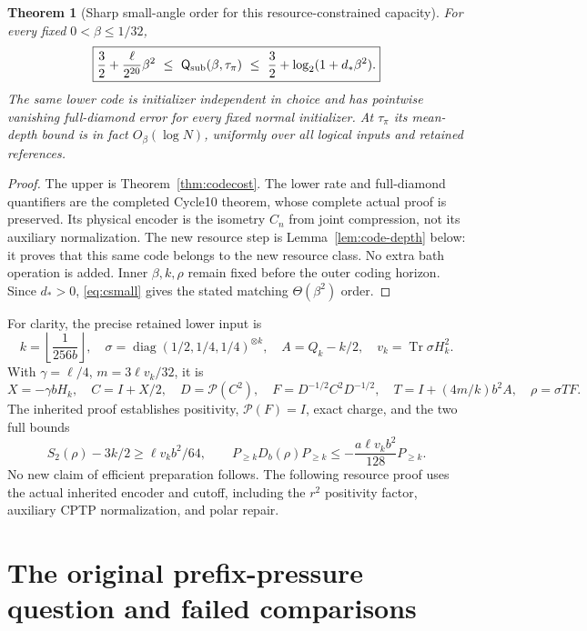 \documentclass[11pt]{article}
\newtheorem{theorem}{Theorem}[section]
\newcommand{\Tr}{\operatorname{Tr}}
\newcommand{\Qcap}{\mathsf Q}
\newcommand{\pin}{\mathcal P}
\begin{document}
\begin{theorem}[Sharp small-angle order for this resource-constrained capacity]
\label{thm:sublinear}
For every fixed \(0<\beta\le1/32\),
\begin{equation}\label{eq:sublinearcapacity}
 \boxed{\frac32+\frac{\ell}{2^{20}}\beta^2
 \ \le\ \Qcap_{\rm sub}(\beta,\tau_\pi)
 \ \le\ \frac32+\log_2(1+d_*\beta^2).}
\end{equation}
The same lower code is initializer independent in choice and has
pointwise vanishing full-diamond error for every fixed normal initializer.
At \(\tau_\pi\) its mean-depth bound is in fact \(O_\beta(\log N)\),
uniformly over all logical inputs and retained references.
\end{theorem}
\begin{proof}
The upper is Theorem~\ref{thm:codecost}. The lower rate and full-diamond
quantifiers are the completed Cycle10 theorem, whose complete actual
proof is preserved. Its physical encoder is the isometry \(C_n\)
from joint compression, not its auxiliary normalization.
The new resource step is Lemma~\ref{lem:code-depth} below: it proves
that this same code belongs to the new resource class. No extra bath
operation is added. Inner \(\beta,k,\rho\) remain fixed before the outer
coding horizon. Since \(d_*>0\), \eqref{eq:csmall} gives the stated
matching \(\Theta(\beta^2)\) order.
\end{proof}

For clarity, the precise retained lower input is
\[
 k=\left\lfloor\frac1{256b}\right\rfloor,\quad
 \sigma=\operatorname{diag}(1/2,1/4,1/4)^{\otimes k},\quad
 A=Q_k-k/2,\quad v_k=\Tr\sigma H_k^2.
\]
With \(\gamma=\ell/4\), \(m=3\ell v_k/32\), it is
\[
 X=-\gamma bH_k,\quad C=I+X/2,\quad
 D=\pin(C^2),\quad F=D^{-1/2}C^2D^{-1/2},\quad
 T=I+(4m/k)b^2A,\quad \rho=\sigma TF.
\]
The inherited proof establishes positivity, \(\pin(F)=I\), exact charge,
and the two full bounds
\[
 S_2(\rho)-3k/2\ge\ell v_kb^2/64,\qquad
 P_{\ge k}D_b(\rho)P_{\ge k}\le
 -\frac{a\ell v_kb^2}{128}P_{\ge k}.
\]
No new claim of efficient preparation follows. The following resource
proof uses the actual inherited encoder and cutoff, including the
\(r^2\) positivity factor, auxiliary CPTP normalization, and polar repair.



\section{The original prefix-pressure question and failed comparisons}
\end{document}
